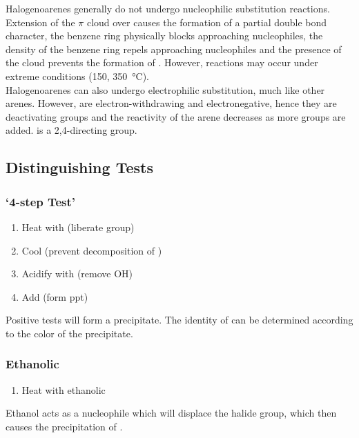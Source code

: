 \documentclass[../main]{subfiles}
\begin{document}
	Halogenoarenes generally do not undergo nucleophilic substitution reactions. Extension of the \(\pi\)  cloud over  causes the formation of a partial double bond character, the benzene ring physically blocks approaching nucleophiles, the  density of the benzene ring repels approaching nucleophiles and the presence of the  cloud prevents the formation of . However, reactions may occur under extreme conditions (\SI{150}{\atm}, \SI{350}{\celsius}).\\

	Halogenoarenes can also undergo electrophilic substitution, much like other arenes. However,  are electron-withdrawing and electronegative, hence they are deactivating groups and the reactivity of the arene decreases as more  groups are added.  is a 2,4-directing group.

	\subsection{Distinguishing Tests}

	\subsubsection{`4-step Test'}

	\begin{enumerate}
		\item Heat with  (liberate  group)
		\item Cool (prevent decomposition of )
		\item Acidify with  (remove OH)
		\item Add  (form ppt)
	\end{enumerate}

	Positive tests will form a  precipitate. The identity of  can be determined according to the color of the precipitate. \\

	\subsubsection{Ethanolic }

	\begin{enumerate}
		\item Heat with ethanolic 
	\end{enumerate}

	Ethanol acts as a nucleophile which will displace the halide group, which then causes the precipitation of .
\end{document}
